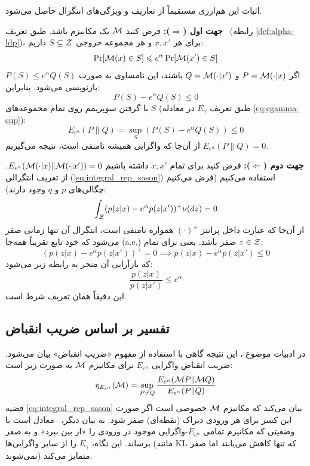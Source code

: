 \begin{اثبات}
اثبات این هم‌ارزی مستقیماً از تعاریف و ویژگی‌های انتگرال حاصل می‌شود.

\textbf{جهت اول ($\Rightarrow$):}
فرض کنید $\mech$ یک مکانیزم \LDP باشد. طبق تعریف \LDP\ (رابطه \ref{def:alpha-ldp})، برای هر $x, x'$ و هر مجموعه خروجی $S \subseteq \Zset$ داریم:
\begin{equation}
\Pr[\mech(x) \in S] \le e^\alpha \Pr[\mech(x') \in S]
\end{equation}
اگر $P = \mech(\cdot|x)$ و $Q = \mech(\cdot|x')$ باشند، این نامساوی به صورت $P(S) \le e^\alpha Q(S)$ بازنویسی می‌شود. بنابراین:
\begin{equation}
P(S) - e^\alpha Q(S) \le 0
\end{equation}
با گرفتن سوپریمم روی تمام مجموعه‌های $S$ (طبق تعریف $E_\gamma$ در معادله \eqref{eq:egamma-sup}):
\begin{equation}
E_{e^\alpha}(P \| Q) = \sup_S (P(S) - e^\alpha Q(S)) \le 0
\end{equation}
از آن‌جا که واگرایی همیشه نامنفی است، نتیجه می‌گیریم $E_{e^\alpha}(P \| Q) = 0$.

\textbf{جهت دوم ($\Leftarrow$):}
فرض کنید برای تمام $x, x'$ داشته باشیم $E_{e^\alpha}(\mech(\cdot|x) \| \mech(\cdot|x')) = 0$.
از تعریف انتگرالی (\ref{eq:integral_rep_sason}) استفاده می‌کنیم (فرض می‌کنیم چگالی‌های $p$ و $q$ وجود دارند):
\begin{equation}
\int_{\Zset} (p(z|x) - e^\alpha p(z|x'))^+ \nu(dz) = 0
\end{equation}
از آن‌جا که عبارت داخل پرانتز $( \cdot )^+$ همواره نامنفی است، انتگرال آن تنها زمانی صفر می‌شود که خود تابع تقریباً همه‌جا (a.e.) صفر باشد. یعنی برای تمام $z \in \Zset$:
\begin{equation}
(p(z|x) - e^\alpha p(z|x'))^+ = 0 \implies p(z|x) - e^\alpha p(z|x') \le 0
\end{equation}
که بازآرایی آن منجر به رابطه زیر می‌شود:
\begin{equation}
\frac{p(z|x)}{p(z|x')} \le e^\alpha
\end{equation}
این دقیقاً همان تعریف شرط \LDP است.
\end{اثبات}

\subsection{تفسیر بر اساس ضریب انقباض}
در ادبیات موضوع \cite{Asoodeh2021}، این نتیجه گاهی با استفاده از مفهوم «ضریب انقباض» بیان می‌شود. ضریب انقباض واگرایی $E_{e^\alpha}$ برای مکانیزم $\mech$ به صورت زیر است:
\begin{equation}
\eta_{E_{e^\alpha}}(\mech) = \sup_{P \neq Q} \frac{E_{e^\alpha}(\mech P \| \mech Q)}{E_{e^\alpha}(P \| Q)}
\end{equation}
قضیه \ref{eq:integral_rep_sason} بیان می‌کند که مکانیزم $\mech$ خصوصی است اگر صورت این کسر برای هر ورودی دیراک (نقطه‌ای) صفر شود. به بیان دیگر، \LDP\ معادل است با وضعیتی که مکانیزم تمامی $E_{e^\alpha}$-واگرایی موجود در ورودی را «از بین ببرد» و به صفر برساند. این نگاه، $E_\gamma$ را از سایر واگرایی‌ها (مانند KL که تنها کاهش می‌یابند اما صفر نمی‌شوند) متمایز می‌کند.


